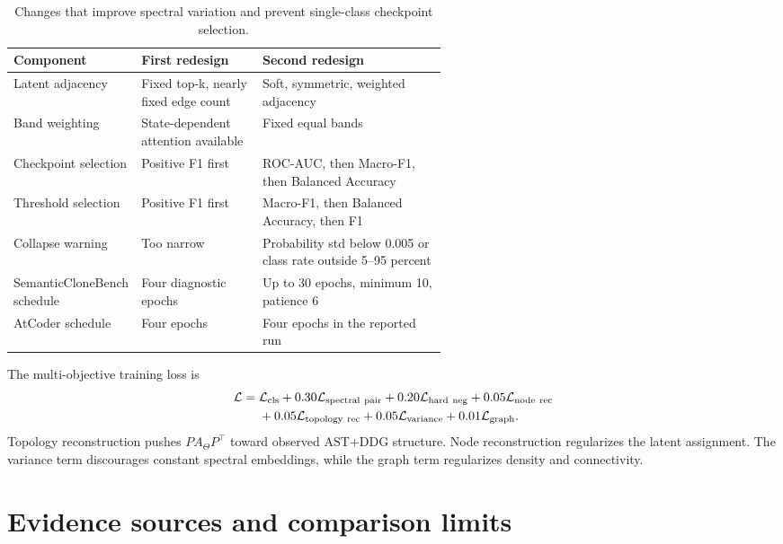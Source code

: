 \documentclass[11pt,a4paper]{article}
\begin{document}
\begin{table}[H]
\centering
\small
\begin{tabularx}{\linewidth}{p{0.27\linewidth}p{0.29\linewidth}X}
\toprule
Component & First redesign & Second redesign \\
\midrule
Latent adjacency & Fixed top-k, nearly fixed edge count & Soft, symmetric, weighted adjacency \\
Band weighting & State-dependent attention available & Fixed equal bands \\
Checkpoint selection & Positive F1 first & ROC-AUC, then Macro-F1, then Balanced Accuracy \\
Threshold selection & Positive F1 first & Macro-F1, then Balanced Accuracy, then F1 \\
Collapse warning & Too narrow & Probability std below 0.005 or class rate outside 5--95 percent \\
SemanticCloneBench schedule & Four diagnostic epochs & Up to 30 epochs, minimum 10, patience 6 \\
AtCoder schedule & Four epochs & Four epochs in the reported run \\
\bottomrule
\end{tabularx}
\caption{Changes that improve spectral variation and prevent single-class
checkpoint selection.}
\end{table}

The multi-objective training loss is
\begin{align}
\mathcal L={}&\mathcal L_{\rm cls}
+0.30\mathcal L_{\rm spectral\ pair}
+0.20\mathcal L_{\rm hard\ neg}
+0.05\mathcal L_{\rm node\ rec}\\
&+0.05\mathcal L_{\rm topology\ rec}
+0.05\mathcal L_{\rm variance}
+0.01\mathcal L_{\rm graph}.
\end{align}
Topology reconstruction pushes $PA_\Theta P^\top$ toward observed AST+DDG
structure. Node reconstruction regularizes the latent assignment. The
variance term discourages constant spectral embeddings, while the graph term
regularizes density and connectivity.

\section{Evidence sources and comparison limits}
\end{document}
